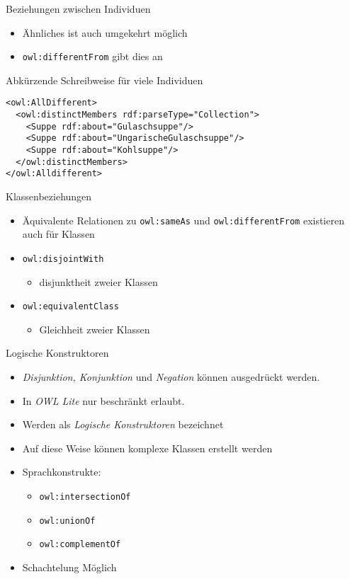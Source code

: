 \documentclass{beamer}
\begin{document}
\begin{frame}[fragile]{Beziehungen zwischen Individuen}
\begin{itemize}
\item Ähnliches ist auch umgekehrt möglich
\item \texttt{owl:differentFrom} gibt dies an
\end{itemize}
\begin{block}{Abkürzende Schreibweise für viele Individuen}
\begin{lstlisting}[lang="xml"]
<owl:AllDifferent>
  <owl:distinctMembers rdf:parseType="Collection">
    <Suppe rdf:about="Gulaschsuppe"/>
    <Suppe rdf:about="UngarischeGulaschsuppe"/>
    <Suppe rdf:about="Kohlsuppe"/>
  </owl:distinctMembers>
</owl:Alldifferent>
\end{lstlisting}
\end{block}

\end{frame}
%
\begin{frame}[fragile]{Klassenbeziehungen}
\begin{itemize}
\item Äquivalente Relationen zu \texttt{owl:sameAs} und \texttt{owl:differentFrom}
existieren auch für Klassen
\item \texttt{owl:disjointWith}
\begin{itemize}
 \item disjunktheit zweier Klassen
\end{itemize}
\item \texttt{owl:equivalentClass}
\begin{itemize}
 \item Gleichheit zweier Klassen
\end{itemize}
\end{itemize}
\end{frame}
%
\begin{frame}[fragile]{Logische Konstruktoren}
\begin{itemize}
\item \emph{Disjunktion, Konjunktion} und \emph{Negation} können
ausgedrückt werden.
\item In \emph{OWL Lite} nur beschränkt erlaubt.
\item Werden als \emph{Logische Konstruktoren} bezeichnet
\item Auf diese Weise können komplexe Klassen erstellt werden
\item Sprachkonstrukte:
\begin{itemize}
\item \texttt{owl:intersectionOf}
\item \texttt{owl:unionOf}
\item \texttt{owl:complementOf}
\end{itemize}
\item Schachtelung Möglich
\end{itemize}
\end{frame}
\end{document}
